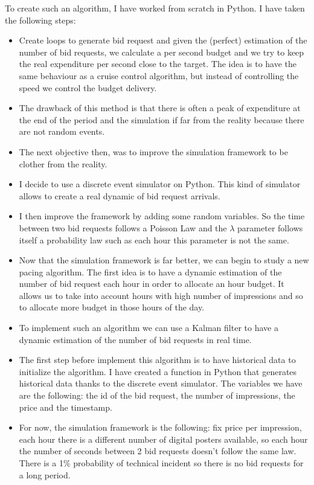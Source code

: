 \documentclass[12pt]{article}
\begin{document}
To create such an algorithm, I have worked from scratch in Python. I have taken the following steps:
\begin{itemize}
\item Create loops to generate bid request and given the (perfect) estimation of the number of bid requests, we calculate a per second budget and we try to keep the real expenditure per second close to the target. The idea is to have the same behaviour as a cruise control algorithm, but instead of controlling the speed we control the budget delivery.
\item The drawback of this method is that there is often a peak of expenditure at the end of the period and the simulation if far from the reality because there are not random events. 
\item The next objective then, was to improve the simulation framework to be clother from the reality.
\item I decide to use a discrete event simulator on Python. This kind of simulator allows to create a real dynamic of bid request arrivals.
\item I then improve the framework by adding some random variables. So the time between two bid requests follows a Poisson Law and the $\lambda$ parameter follows itself a probability law such as each hour this parameter is not the same. 
\item Now that the simulation framework is far better, we can begin to study a new pacing algorithm. The first idea is to have a dynamic estimation of the number of bid request each hour in order to allocate an hour budget. It allows us to take into account hours with high number of impressions and so to allocate more budget in those hours of the day. 
\item To implement such an algorithm we can use a Kalman filter to have a dynamic estimation of the number of bid requests in real time. 	
\item The first step before implement this algorithm is to have historical data to initialize the algorithm. I have created a function in Python that generates historical data thanks to the discrete event simulator. The variables we have are the following: the id of the bid request, the number of impressions, the price and the timestamp.
\item For now, the simulation framework is the following: fix price per impression, each hour there is a different number of digital posters available, so each hour the number of seconds between 2 bid requests doesn't follow the same law. There is a 1\% probability of technical incident so there is no bid requests for a long period. 

\end{itemize}
\end{document}
